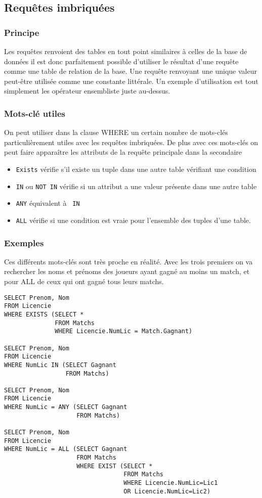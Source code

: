 \documentclass[10pt,a4paper,twoside]{article}
\begin{document}
\subsection{Requêtes imbriquées}
\subsubsection{Principe} 
Les requêtes renvoient des tables en tout point similaires à celles de la base de données il est donc parfaitement possible d'utiliser le résultat d'une requête comme une table de relation de la base. Une requête renvoyant une unique valeur peut-être utilisée comme une constante littérale. Un exemple d'utilisation est tout simplement les opérateur ensembliste juste au-dessus. \\

\subsubsection{Mots-clé utiles} 
On peut utiliser dans la clause WHERE un certain nombre de mots-clés particulièrement utiles avec les requêtes imbriquées. De plus avec ces mots-clés on peut faire apparaître les attributs de la requête principale dans la secondaire
\begin{itemize}
\item \verb=Exists= vérifie s'il existe un tuple dans une autre table vérifiant une condition
\item \verb=IN= ou \verb=NOT IN= vérifie si un attribut a une valeur présente dans une autre table
\item \verb=ANY= équivalent à \verb= IN=
\item \verb=ALL= vérifie si une condition est vraie pour l'ensemble des tuples d'une table.
\end{itemize}

\subsubsection{Exemples} 
Ces différents mots-clés sont très proche en réalité. Avec les trois premiers on va rechercher les noms et prénoms des joueurs ayant gagné au moins un match, et pour ALL de ceux qui ont gagné tous leurs matchs.
\begin{verbatim}
SELECT Prenom, Nom
FROM Licencie
WHERE EXISTS (SELECT *
              FROM Matchs
              WHERE Licencie.NumLic = Match.Gagnant)
              
SELECT Prenom, Nom
FROM Licencie
WHERE NumLic IN (SELECT Gagnant
                 FROM Matchs)
              
SELECT Prenom, Nom
FROM Licencie
WHERE NumLic = ANY (SELECT Gagnant
                    FROM Matchs)
              
SELECT Prenom, Nom
FROM Licencie
WHERE NumLic = ALL (SELECT Gagnant
                    FROM Matchs
                    WHERE EXIST (SELECT *
                                 FROM Matchs
                                 WHERE Licencie.NumLic=Lic1
                                 OR Licencie.NumLic=Lic2)
\end{verbatim}
\end{document}
